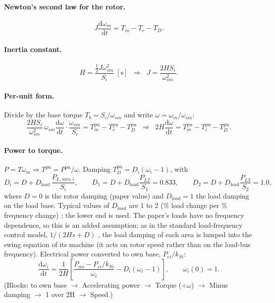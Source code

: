 \documentclass[11pt,a4paper]{article}
\numberwithin{equation}{section}
\newcommand{\dd}{\mathrm{d}}
\newcommand{\blk}[1]{\textsf{#1}}
\begin{document}
\paragraph{Newton's second law for the rotor.}
\begin{equation}
J\frac{\dd\omega_{m}}{\dd t} = T_m - T_e - T_D .
\end{equation}
\paragraph{Inertia constant.}
\begin{equation}
H = \frac{\tfrac12 J\omega_{sm}^2}{S_i}\;[\text{s}]
\;\;\Longrightarrow\;\;
J = \frac{2HS_i}{\omega_{sm}^2}.
\end{equation}
\paragraph{Per-unit form.} Divide by the base torque $T_b = S_i/\omega_{sm}$ and write $\omega = \omega_m/\omega_{sm}$:
\begin{equation}
\frac{2HS_i}{\omega_{sm}^2}\,\omega_{sm}\frac{\dd\omega}{\dd t}\cdot\frac{\omega_{sm}}{S_i}
= T_m^{\text{pu}} - T_e^{\text{pu}} - T_D^{\text{pu}}
\;\;\Longrightarrow\;\;
2H\frac{\dd\omega}{\dd t} = T_m^{\text{pu}} - T_e^{\text{pu}} - T_D^{\text{pu}} .
\end{equation}
\paragraph{Power to torque.} $P = T\omega_m \Rightarrow T^{\text{pu}} = P^{\text{pu}}/\omega$. Damping $T_D^{\text{pu}} = D_i(\omega_i-1)$, with
\begin{equation}
D_i = D + D_{\text{load}}\,\frac{P_{L,\text{area }i}}{S_i},\qquad
D_1 = D + D_{\text{load}}\frac{P_{L2}}{S_1} = 0.833,\qquad
D_2 = D + D_{\text{load}}\frac{P_{L3}}{S_2} = 1.0 ,
\label{eq:Di}
\end{equation}
where $D = 0$ is the rotor damping (paper value) and $D_{\text{load}} = 1$ the load damping on the load base. Typical values of $D_{\text{load}}$ are 1 to 2 (\% load change per \% frequency change) \cite[Sec.~11.1.3]{Kundur1994}; the lower end is used. The paper's loads have no frequency dependence, so this is an added assumption; as in the standard load-frequency control model, $1/(2Hs + D)$ \cite[Ch.~11]{Kundur1994}, the load damping of each area is lumped into the swing equation of its machine (it acts on rotor speed rather than on the load-bus frequency).
Electrical power converted to own base, $P_{ei}/k_{Si}$:
\begin{equation}
\boxed{\frac{\dd\omega_i}{\dd t} = \frac{1}{2H}\left[\frac{P_{mi} - P_{ei}/k_{Si}}{\omega_i} - D_i(\omega_i - 1)\right],\qquad \omega_i(0)=1.}
\label{eq:swing}
\end{equation}
(Blocks: \blk{to own base} $\to$ \blk{Accelerating power} $\to$ \blk{Torque} ($\div\omega$) $\to$ \blk{Minus damping} $\to$ \blk{1 over 2H} $\to$ \blk{Speed}.)
\end{document}
